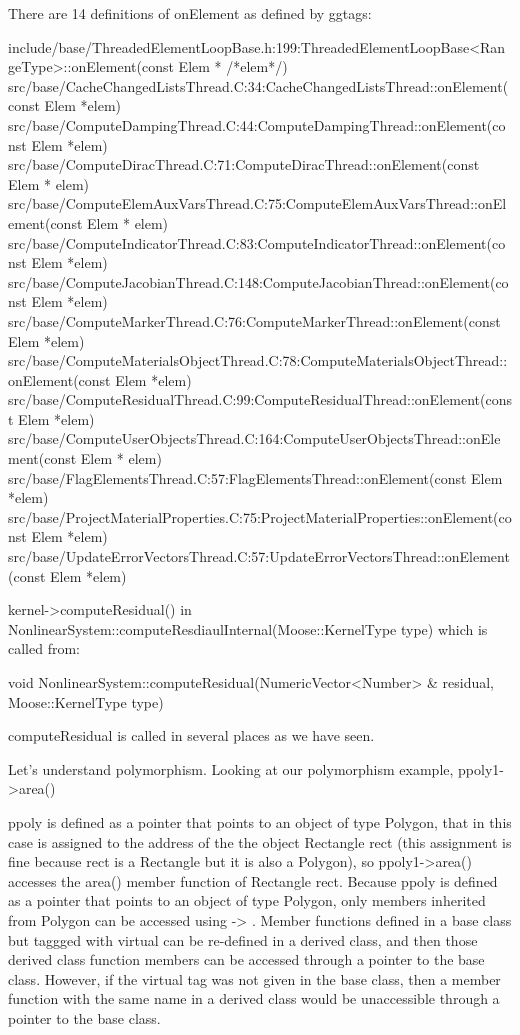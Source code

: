 {There are 14 definitions of onElement as defined by ggtags:

include/base/ThreadedElementLoopBase.h:199:ThreadedElementLoopBase<RangeType>::onElement(const Elem * /*elem*/)
src/base/CacheChangedListsThread.C:34:CacheChangedListsThread::onElement(const Elem *elem)
src/base/ComputeDampingThread.C:44:ComputeDampingThread::onElement(const Elem *elem)
src/base/ComputeDiracThread.C:71:ComputeDiracThread::onElement(const Elem * elem)
src/base/ComputeElemAuxVarsThread.C:75:ComputeElemAuxVarsThread::onElement(const Elem * elem)
src/base/ComputeIndicatorThread.C:83:ComputeIndicatorThread::onElement(const Elem *elem)
src/base/ComputeJacobianThread.C:148:ComputeJacobianThread::onElement(const Elem *elem)
src/base/ComputeMarkerThread.C:76:ComputeMarkerThread::onElement(const Elem *elem)
src/base/ComputeMaterialsObjectThread.C:78:ComputeMaterialsObjectThread::onElement(const Elem *elem)
src/base/ComputeResidualThread.C:99:ComputeResidualThread::onElement(const Elem *elem)
src/base/ComputeUserObjectsThread.C:164:ComputeUserObjectsThread::onElement(const Elem * elem)
src/base/FlagElementsThread.C:57:FlagElementsThread::onElement(const Elem *elem)
src/base/ProjectMaterialProperties.C:75:ProjectMaterialProperties::onElement(const Elem *elem)
src/base/UpdateErrorVectorsThread.C:57:UpdateErrorVectorsThread::onElement(const Elem *elem)

kernel->computeResidual() in NonlinearSystem::computeResdiaulInternal(Moose::KernelType type) which is called from:

void
NonlinearSystem::computeResidual(NumericVector<Number> & residual, Moose::KernelType type)

computeResidual is called in several places as we have seen.

Let's understand polymorphism. Looking at our polymorphism example, ppoly1->area()

ppoly is defined as a pointer that points to an object of type Polygon, that in this case is assigned to the address of the the object Rectangle rect (this assignment is fine because rect is a Rectangle but it is also a Polygon), so ppoly1->area() accesses the area() member function of Rectangle rect. Because ppoly is defined as a pointer that points to an object of type Polygon, only members inherited from Polygon can be accessed using -> . Member functions defined in a base class but taggged with virtual can be re-defined in a derived class, and then those derived class function members can be accessed through a pointer to the base class. However, if the virtual tag was not given in the base class, then a member function with the same name in a derived class would be unaccessible through a pointer to the base class.

}
